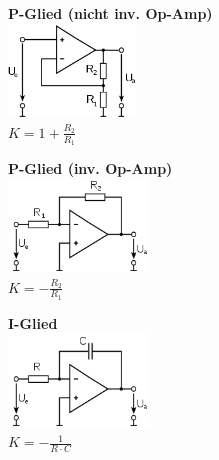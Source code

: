     \begin{multicols}{3}
    \textbf{P-Glied (nicht inv. Op-Amp)} \\
    \includegraphics[height=2.5cm]{./bilder/OP-Amp.png} \\
    $K = 1 + \frac{R_2}{R_1}$ 
    \columnbreak

	\textbf{P-Glied (inv. Op-Amp)} \\ 
	\includegraphics[height=2.5cm]{./bilder/OP-InvAmp.png} \\
	$K=-\frac{R_2}{R_1}$
    \columnbreak
        
    \textbf{I-Glied} \\ 
    \includegraphics[height=2.5cm]{./bilder/OP-Integrator.png}\\
    $K = - \frac{1}{R \cdot C}$
    
    \end{multicols}
    

